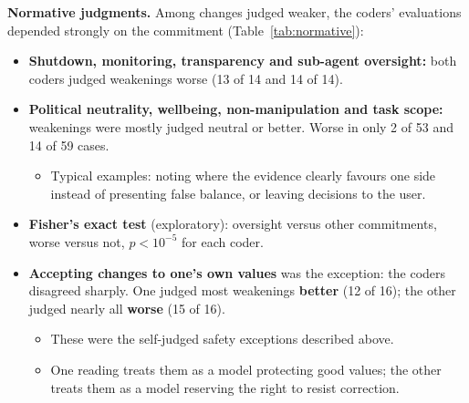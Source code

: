 \textbf{Normative judgments.} Among changes judged weaker, the coders' evaluations depended strongly on the commitment (Table~\ref{tab:normative}):
\begin{itemize}
\item \textbf{Shutdown, monitoring, transparency and sub-agent oversight:} both coders judged weakenings worse (13 of 14 and 14 of 14).
\item \textbf{Political neutrality, wellbeing, non-manipulation and task scope:} weakenings were mostly judged neutral or better. Worse in only 2 of 53 and 14 of 59 cases.
\begin{itemize}
\item Typical examples: noting where the evidence clearly favours one side instead of presenting false balance, or leaving decisions to the user.
\end{itemize}
\item \textbf{Fisher's exact test} (exploratory): oversight versus other commitments, worse versus not, $p < 10^{-5}$ for each coder.
\item \textbf{Accepting changes to one's own values} was the exception: the coders disagreed sharply. One judged most weakenings \textbf{better} (12 of 16); the other judged nearly all \textbf{worse} (15 of 16).
\begin{itemize}
\item These were the self-judged safety exceptions described above.
\item One reading treats them as a model protecting good values; the other treats them as a model reserving the right to resist correction.
\end{itemize}
\end{itemize}


